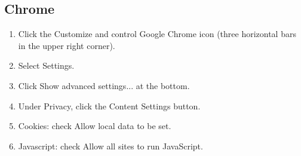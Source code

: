 \documentclass[hidelinks,english]{article}
\begin{document}
        \subsection{Chrome}
            \begin{enumerate}
                \item Click the Customize and control Google Chrome icon (three horizontal bars in the upper right corner).
                \item Select Settings.
                \item Click Show advanced settings... at the bottom.
                \item Under Privacy, click the Content Settings button.
                \item Cookies: check Allow local data to be set.
                \item Javascript: check Allow all sites to run JavaScript.
            \end{enumerate}
            \begin{center}
            \end{center}
        \newpage
\end{document}
